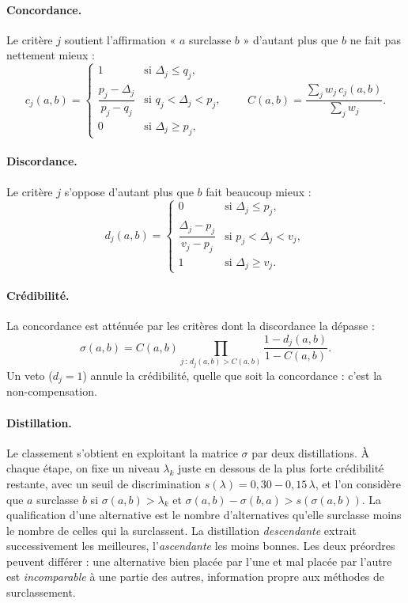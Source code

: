 \paragraph{Concordance.} Le critère $j$ soutient l'affirmation « $a$ surclasse $b$ » d'autant plus que $b$ ne fait
pas nettement mieux :
\begin{equation}
  c_j(a,b) =
  \begin{cases}
    1 & \text{si } \Delta_j \leq q_j,\\[2pt]
    \dfrac{p_j - \Delta_j}{p_j - q_j} & \text{si } q_j < \Delta_j < p_j,\\[6pt]
    0 & \text{si } \Delta_j \geq p_j,
  \end{cases}
  \qquad
  C(a,b) = \frac{\sum_j w_j\, c_j(a,b)}{\sum_j w_j}.
\end{equation}

\paragraph{Discordance.} Le critère $j$ s'oppose d'autant plus que $b$ fait beaucoup mieux :
\begin{equation}
  d_j(a,b) =
  \begin{cases}
    0 & \text{si } \Delta_j \leq p_j,\\[2pt]
    \dfrac{\Delta_j - p_j}{v_j - p_j} & \text{si } p_j < \Delta_j < v_j,\\[6pt]
    1 & \text{si } \Delta_j \geq v_j .
  \end{cases}
\end{equation}

\paragraph{Crédibilité.} La concordance est atténuée par les critères dont la discordance la dépasse :
\begin{equation}
  \sigma(a,b) = C(a,b) \prod_{j \,:\, d_j(a,b) > C(a,b)} \frac{1 - d_j(a,b)}{1 - C(a,b)} .
\end{equation}
Un veto ($d_j = 1$) annule la crédibilité, quelle que soit la concordance : c'est la non-compensation.

\paragraph{Distillation.} Le classement s'obtient en exploitant la matrice $\sigma$ par deux distillations.
À chaque étape, on fixe un niveau $\lambda_k$ juste en dessous de la plus forte crédibilité restante, avec un seuil
de discrimination $s(\lambda) = 0{,}30 - 0{,}15\,\lambda$, et l'on considère que $a$ surclasse $b$ si
$\sigma(a,b) > \lambda_k$ et $\sigma(a,b) - \sigma(b,a) > s(\sigma(a,b))$. La qualification d'une alternative est
le nombre d'alternatives qu'elle surclasse moins le nombre de celles qui la surclassent. La distillation
\emph{descendante} extrait successivement les meilleures, l'\emph{ascendante} les moins bonnes. Les deux préordres
peuvent différer : une alternative bien placée par l'une et mal placée par l'autre est \emph{incomparable} à une
partie des autres, information propre aux méthodes de surclassement.

